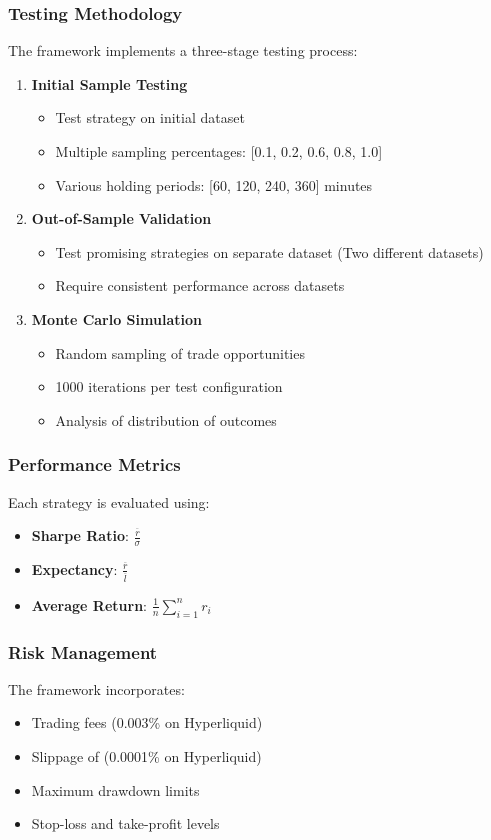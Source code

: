 \documentclass[12pt]{article}
\begin{document}
\subsubsection*{Testing Methodology}
The framework implements a three-stage testing process:
\begin{enumerate}
  \item \textbf{Initial Sample Testing}
    \begin{itemize}
      \item Test strategy on initial dataset
      \item Multiple sampling percentages: [0.1, 0.2, 0.6, 0.8, 1.0]
      \item Various holding periods: [60, 120, 240, 360] minutes
    \end{itemize}
  
  \item \textbf{Out-of-Sample Validation}
    \begin{itemize}
      \item Test promising strategies on separate dataset (Two different datasets)
      \item Require consistent performance across datasets
    \end{itemize}
  
  \item \textbf{Monte Carlo Simulation}
    \begin{itemize}
      \item Random sampling of trade opportunities
      \item 1000 iterations per test configuration
      \item Analysis of distribution of outcomes
    \end{itemize}
\end{enumerate}

\subsubsection*{Performance Metrics}
Each strategy is evaluated using:
\begin{itemize}
  \item \textbf{Sharpe Ratio}: $\frac{\overline{r}}{\sigma}$
  \item \textbf{Expectancy}: $\frac{\overline{r}}{\overline{l}}$
  \item \textbf{Average Return}: $\frac{1}{n}\sum_{i=1}^{n} r_i$
\end{itemize}

\subsubsection*{Risk Management}
The framework incorporates:
\begin{itemize}
  \item Trading fees (0.003\% on Hyperliquid)
  \item  Slippage of (0.0001\% on Hyperliquid)
  \item Maximum drawdown limits
  \item Stop-loss and take-profit levels
\end{itemize}
\end{document}
